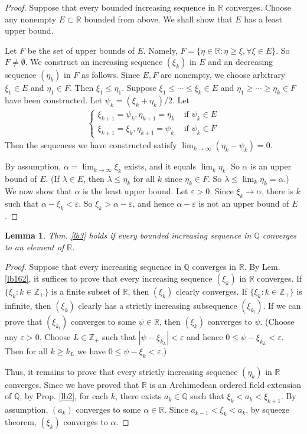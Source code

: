 \documentclass[12pt,b5paper,notitlepage]{article}
\theoremstyle{definition}
\theoremstyle{plain}
\newtheorem{lm}[df]{Lemma}
\newcommand{\Zbb}{\mathbb Z}
\newcommand{\Qbb}{\mathbb Q}
\newcommand{\Rbb}{\mathbb R}
\newcommand{\eps}{\varepsilon}
\numberwithin{equation}{section}
\begin{document}
\begin{proof}
Suppose that every bounded increasing sequence in $\Rbb$ converges. Choose any nonempty $E\subset \Rbb$ bounded from above. We shall show that $E$ has a least upper bound.

Let $F$ be the set of upper bounds of $E$. Namely, $F=\{\eta\in\Rbb:\eta\geq\xi,\forall\xi\in E\}$. So $F\neq\emptyset$. We construct an increasing sequence $(\xi_k)$ in $E$ and an decreasing sequence $(\eta_k)$ in $F$ as follows. Since $E,F$ are nonempty, we choose arbitrary $\xi_1\in E$ and $\eta_1\in F$. Then $\xi_1\leq \eta_1$. Suppose $\xi_1\leq\cdots\leq\xi_k\in E$ and $\eta_1\geq\cdots\geq\eta_k\in F$ have been constructed. Let $\psi_k=(\xi_k+\eta_k)/2$. Let
\begin{gather*}
\left\{
\begin{array}{ll}
\xi_{k+1}=\psi_k,\eta_{k+1}=\eta_k &\text{ if }\psi_k\in E\\
\xi_{k+1}=\xi_k,\eta_{k+1}=\psi_k &\text{ if }\psi_k\in F
\end{array}
\right.
\end{gather*}
Then the sequences we have constructed satisfy $\lim_{k\rightarrow\infty}(\eta_k-\psi_k)=0$.

By assumption, $\alpha=\lim_{k\rightarrow\infty}\xi_k$ exists, and it equals $\lim_k \eta_k$.  So $\alpha$ is an upper bound of $E$. (If $\lambda\in E$, then $\lambda\leq \eta_k$ for all $k$ since $\eta_k\in F$. So $\lambda\leq\lim_k\eta_k=\alpha$.) We now show that $\alpha$ is the least upper bound. Let $\eps>0$. Since $\xi_k\rightarrow\alpha$, there is $k$ such that $\alpha-\xi_k<\eps$. So $\xi_k>\alpha-\eps$, and hence $\alpha-\eps$ is not an upper bound of $E$.
\end{proof}


\begin{lm}\label{lb163}
Thm. \ref{lb3} holds if every bounded increasing sequence in $\Qbb$ converges to an element of $\Rbb$.
\end{lm}

\begin{proof}
Suppose that every increasing sequence in $\Qbb$ converges in $\Rbb$. By Lem. \ref{lb162}, it suffices to prove that every increasing sequence $(\xi_k)$ in $\Rbb$ converges. If $\{\xi_{k}:k\in\Zbb_+\}$ is a finite subset of $\Rbb$, then $(\xi_k)$ clearly converges. If $\{\xi_{k}:k\in\Zbb_+\}$ is infinite, then $(\xi_k)$ clearly has a strictly increasing subsequence $(\xi_{k_l})$. If we can prove that $(\xi_{k_l})$ converges to some $\psi\in\Rbb$, then $(\xi_k)$ converges to $\psi$. (Choose any $\eps>0$. Choose $L\in\Zbb_+$ such that $|\psi-\xi_{k_L}|<\eps$ and hence $0\leq \psi-\xi_{k_L}<\eps$. Then for all $k\geq k_L$ we have $0\leq\psi-\xi_k<\eps$.)

Thus, it remains to prove that every strictly increasing sequence $(\eta_k)$ in $\Rbb$ converges. Since we have proved that $\Rbb$ is an Archimedean ordered field extension of $\Qbb$, by Prop. \ref{lb2}, for each $k$, there exists $a_k\in\Qbb$ such that $\xi_k< a_k< \xi_{k+1}$. By assumption, $(a_k)$ converges to some $\alpha\in\Rbb$. Since $a_{k-1}<\xi_k< a_k$, by squeeze theorem, $(\xi_k)$ converges to $\alpha$.
\end{proof}
\end{document}
